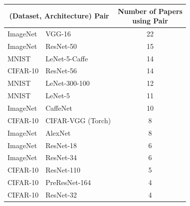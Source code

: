 \begin{table}[t]
\begin{centering}
\begin{tabular}{ll|c}
\multicolumn{2}{c}{(Dataset, Architecture) Pair} & \shortstack{Number of Papers \\ using Pair} \\
\toprule
ImageNet & VGG-16 & 22 \\
ImageNet & ResNet-50 & 15 \\
MNIST & LeNet-5-Caffe & 14 \\
CIFAR-10 & ResNet-56 & 14 \\
MNIST & LeNet-300-100 & 12 \\
MNIST & LeNet-5 & 11 \\
ImageNet & CaffeNet & 10 \\
CIFAR-10 & CIFAR-VGG (Torch) & 8 \\
ImageNet & AlexNet & 8 \\
ImageNet & ResNet-18 & 6 \\
ImageNet & ResNet-34 & 6 \\
CIFAR-10 & ResNet-110 & 5 \\
CIFAR-10 & PreResNet-164 & 4 \\
CIFAR-10 & ResNet-32 & 4 \\

\end{tabular}
\end{centering}
\end{table}
